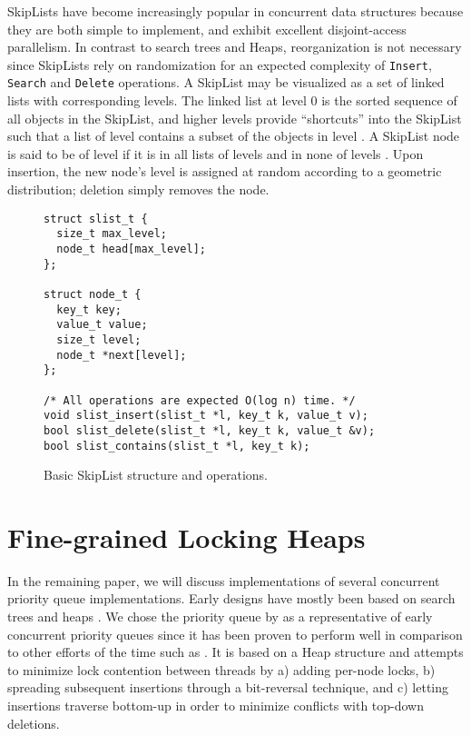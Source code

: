 \documentclass[a4paper,10pt]{article}
\begin{document}
SkipLists \cite{pugh1990skip} have become increasingly popular in concurrent data structures because
they are both simple to implement, and exhibit excellent disjoint-access parallelism. In contrast to
search trees and Heaps, reorganization is not necessary since SkipLists rely on
randomization for an expected  complexity of \lstinline|Insert|, \lstinline|Search|
and \lstinline|Delete| operations.
A SkipList may be visualized as a set of linked lists with corresponding levels. The linked
list at level 0 is the sorted sequence of all objects in the SkipList,
and higher levels provide ``shortcuts''
into the SkipList such that a list of level  contains a subset of the objects in level
. A SkipList node  is said to be of level  if it is in all lists of levels 
and in none of levels . Upon insertion, the new node's level is assigned at random
according to a geometric distribution; deletion simply removes the node.

\begin{figure}[ht]
\begin{lstlisting}
struct slist_t {
  size_t max_level;
  node_t head[max_level];
};

struct node_t {
  key_t key;
  value_t value;
  size_t level;
  node_t *next[level];
};

/* All operations are expected O(log n) time. */
void slist_insert(slist_t *l, key_t k, value_t v);
bool slist_delete(slist_t *l, key_t k, value_t &v);
bool slist_contains(slist_t *l, key_t k);
\end{lstlisting}
\caption{Basic SkipList structure and operations.}
\label{fig:basicsl}
\end{figure}

\section{Fine-grained Locking Heaps} \label{sec:hunt}

In the remaining paper, we will discuss implementations of several concurrent priority queue implementations.
Early designs have mostly been based on search trees \cite{boyar1994chromatic,johnson1991highly} and
heaps \cite{ayani1990lr,biswas1987simultaneous,das1996distributed,deo1992parallel,huang1991evaluation,
luchetti1993some,mans1998portable,olariu1991optimal,prasad1995parallel}.
We chose the priority queue by \citeauthor{hunt1996efficient} \cite{hunt1996efficient}
as a representative of early concurrent priority queues since it has been proven to
perform well \cite{shavit2000skiplist} in comparison to other efforts of the time such as \cite{nageshwara1988concurrent,ayani1990lr,yan1998lock}. It is based on a Heap
structure and attempts to minimize lock contention between threads by a) adding per-node
locks, b) spreading subsequent insertions through a bit-reversal technique, and c) letting insertions traverse bottom-up in order to minimize conflicts with
top-down deletions.
\end{document}
